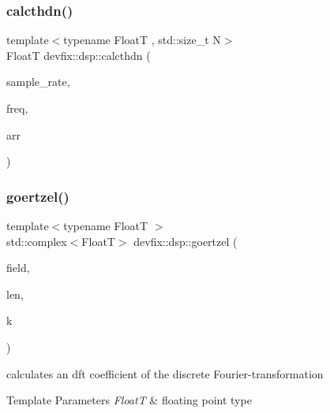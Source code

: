 \mbox{\label{namespacedevfix_1_1dsp_a54194236560fd3dd40df38df44966d8e}} 
\subsubsection{\texorpdfstring{calcthdn()}{calcthdn()}\hspace{0.1cm}{\footnotesize\ttfamily [3/3]}}
{\footnotesize\ttfamily template$<$typename FloatT , std\+::size\+\_\+t N$>$ \\
FloatT devfix\+::dsp\+::calcthdn (\begin{DoxyParamCaption}\item[{std\+::size\+\_\+t}]{sample\+\_\+rate,  }\item[{FloatT}]{freq,  }\item[{const std\+::array$<$ FloatT, N $>$ \&}]{arr }\end{DoxyParamCaption})}

\mbox{\label{namespacedevfix_1_1dsp_a5e776756816f3429899134f5c8b8b215}} 
\subsubsection{\texorpdfstring{goertzel()}{goertzel()}\hspace{0.1cm}{\footnotesize\ttfamily [1/3]}}
{\footnotesize\ttfamily template$<$typename FloatT $>$ \\
std\+::complex$<$FloatT$>$ devfix\+::dsp\+::goertzel (\begin{DoxyParamCaption}\item[{const std\+::complex$<$ FloatT $>$ $\ast$}]{field,  }\item[{std\+::size\+\_\+t}]{len,  }\item[{std\+::size\+\_\+t}]{k }\end{DoxyParamCaption})}



calculates an dft coefficient of the discrete Fourier-\/transformation 


\begin{DoxyTemplParams}{Template Parameters}
{\em FloatT} & floating point type \\
\hline
\end{DoxyTemplParams}

